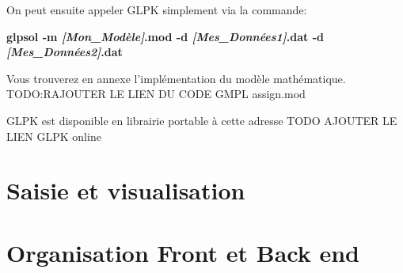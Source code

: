 \documentclass{polytech/polytech}
\begin{document}
On peut ensuite appeler GLPK simplement via la commande:
\begin{center}
\textbf{glpsol -m \textit{[Mon\_Modèle]}.mod -d \textit{[Mes\_Données1]}.dat -d \textit{[Mes\_Données2]}.dat}
\end{center}

Vous trouverez en annexe  l'implémentation du modèle mathématique. TODO:RAJOUTER LE LIEN DU CODE GMPL assign.mod

GLPK est disponible en librairie portable à cette adresse TODO AJOUTER LE LIEN GLPK online

\section{Saisie et visualisation}
\section{Organisation Front et Back end}

\end{document}
